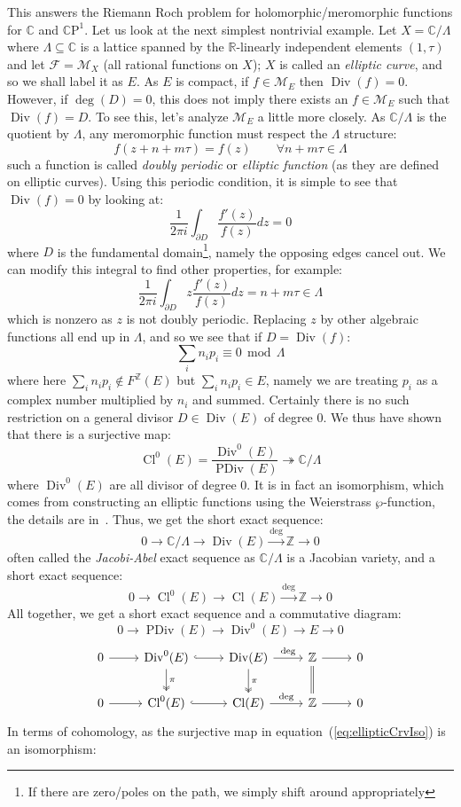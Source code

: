 \documentclass{ut-thesis}
\newcommand{\R}{{\mathbb{R}}}
\newcommand{\Z}{{\mathbb{Z}}}
\newcommand{\C}{{\mathbb{C}}}
\newcommand{\CM}{{\mathcal{M}}}
\newcommand{\CF}{{\mathcal{F}}}
\newcommand{\CP}{{\mathbb{C}\mathrm{P}}}
\newcommand{\sse}{\subseteq}
\renewcommand{\mod}{\,\operatorname{mod}\,}
\newcommand{\Div}{{\operatorname{Div}}}
\newcommand{\PDiv}{{\operatorname{PDiv}}}
\renewcommand{\deg}{{\operatorname{deg}}}
\renewcommand{\div}{{\operatorname{Div}}}
\newcommand{\Cl}{{\operatorname{Cl}}}
\begin{document}
This answers the Riemann Roch problem for holomorphic/meromorphic functions for $\C$ and $\CP^1$. Let us look
at the next simplest nontrivial example. Let $X = \C/\Lambda$ where $\Lambda\sse \C$ is a lattice spanned by
the $\R$-linearly independent elements $(1,\tau)$ and let $\CF = \CM_X$ (all rational functions on $X$); $X$
is called an \emph{elliptic curve}, and so we shall label it as $E$. As $E$ is compact, if $f \in \CM_E$ then
$\div(f) = 0$. However, if $\deg(D) = 0$, this does not imply there exists an $f \in \CM_E$ such that $\div(f)
= D$. To see this, let's analyze $\CM_E$ a little more closely. As $\C/\Lambda$ is the quotient by $\Lambda$,
any meromorphic function must respect the $\Lambda$ structure:
\[
  f(z+n+m\tau) = f(z) \qquad \forall n+m\tau \in \Lambda
\]
such a function is called \emph{doubly periodic} or \emph{elliptic function} (as they are defined on elliptic
curves). Using this periodic condition, it is simple to see that
$\div(f) = 0$ by looking at:
\[
  \frac{1}{2\pi i}\int_{\partial D} \frac{f'(z)}{f(z)}dz = 0
\]
where $D$ is the fundamental domain\footnote{If there are zero/poles on the path, we simply shift around
appropriately}, namely the opposing edges cancel out. We can modify this integral to find other properties,
for example:
\[
  \frac{1}{2\pi i}\int_{\partial D} z\frac{f'(z)}{f(z)}dz = n + m\tau \in \Lambda
\]
which is nonzero as $z$ is not doubly periodic. Replacing $z$ by other algebraic functions all end up in
$\Lambda$, and so we see that if $D = \div(f)$:
\[
  \sum_i n_ip_i \equiv 0 \mod \Lambda
\]
where here $\sum_i n_ip_i\notin F^\Z(E)$ but $\sum_i n_ip_i \in E$, namely we are treating $p_i$ as a complex
number multiplied by $n_i$ and summed. Certainly there is no such restriction on
a general divisor $D \in \Div(E)$ of degree $0$. We thus have shown that there is a surjective map:
\begin{equation}\label{eq:ellipticCrvIso}
  \Cl^0(E) = \frac{\Div^0(E)}{\PDiv(E)} \twoheadrightarrow \C/\Lambda
\end{equation}
where $\Div^0(E)$ are all divisor of degree $0$. It is in fact an isomorphism, which comes from constructing
an elliptic functions using the Weierstrass $\wp$-function, the details are
in~\cite[chapter~5]{NateComplexAnalysis}. Thus, we get the short exact sequence:
\[
  0 \to \C/\Lambda \to \Div(E) \xrightarrow{\deg} \Z \to 0
\]
often called the \emph{Jacobi-Abel} exact sequence as $\C/\Lambda$ is a Jacobian variety, and a short exact sequence:
\[
  0 \to \Cl^0(E) \to \Cl(E) \xrightarrow{\deg} \Z \to 0
\]
All together, we get a short exact sequence and a commutative diagram:
\[
  0 \to \PDiv(E) \to \Div^0(E) \to E \to 0
\]
\[
\begin{tikzcd}
0 \arrow[r] & \mathrm{Div}^0(E) \arrow[r, hook] \arrow[d, two heads, "\pi"] & \mathrm{Div}(E) \arrow[r, "\deg"] \arrow[d, two heads, "\pi"] & \mathbb{Z} \arrow[r] \arrow[d, equals] & 0 \\
0 \arrow[r] & \Cl^0(E) \arrow[r, hook] & \Cl(E) \arrow[r, "\deg"] & \mathbb{Z} \arrow[r] & 0
\end{tikzcd}
\]
In terms of cohomology, as the surjective map in equation~(\ref{eq:ellipticCrvIso}) is an isomorphism:
\end{document}

